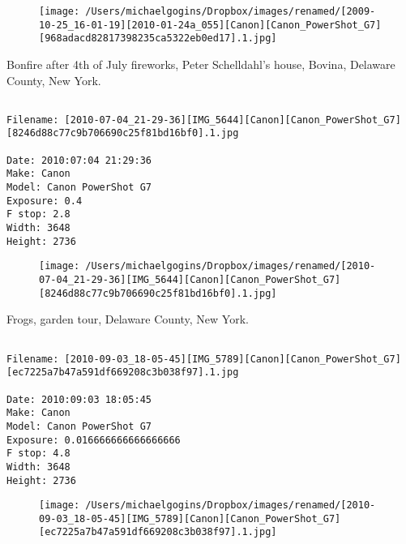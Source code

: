\documentclass[11pt,letter,DIV=14,paper=landscape]{scrbook}
\begin{document}
\begin{figure}
\texttt{[image: /Users/michaelgogins/Dropbox/images/renamed/[2009-10-25\_16-01-19][2010-01-24a\_055][Canon][Canon\_PowerShot\_G7][968adacd82817398235ca5322eb0ed17].1.jpg]}
\end{figure}
    
\clearpage
\noindent Bonfire after 4th of July fireworks, Peter Schelldahl's house, Bovina, Delaware County, New York.
\noindent
\begin{lstlisting}

Filename: [2010-07-04_21-29-36][IMG_5644][Canon][Canon_PowerShot_G7][8246d88c77c9b706690c25f81bd16bf0].1.jpg

Date: 2010:07:04 21:29:36
Make: Canon
Model: Canon PowerShot G7
Exposure: 0.4
F stop: 2.8
Width: 3648
Height: 2736
\end{lstlisting}
\clearpage

\begin{figure}
\texttt{[image: /Users/michaelgogins/Dropbox/images/renamed/[2010-07-04\_21-29-36][IMG\_5644][Canon][Canon\_PowerShot\_G7][8246d88c77c9b706690c25f81bd16bf0].1.jpg]}
\end{figure}
    
\clearpage
\noindent Frogs, garden tour, Delaware County, New York.
\noindent
\begin{lstlisting}

Filename: [2010-09-03_18-05-45][IMG_5789][Canon][Canon_PowerShot_G7][ec7225a7b47a591df669208c3b038f97].1.jpg

Date: 2010:09:03 18:05:45
Make: Canon
Model: Canon PowerShot G7
Exposure: 0.016666666666666666
F stop: 4.8
Width: 3648
Height: 2736
\end{lstlisting}
\clearpage

\begin{figure}
\texttt{[image: /Users/michaelgogins/Dropbox/images/renamed/[2010-09-03\_18-05-45][IMG\_5789][Canon][Canon\_PowerShot\_G7][ec7225a7b47a591df669208c3b038f97].1.jpg]}
\end{figure}
    
\end{document}
